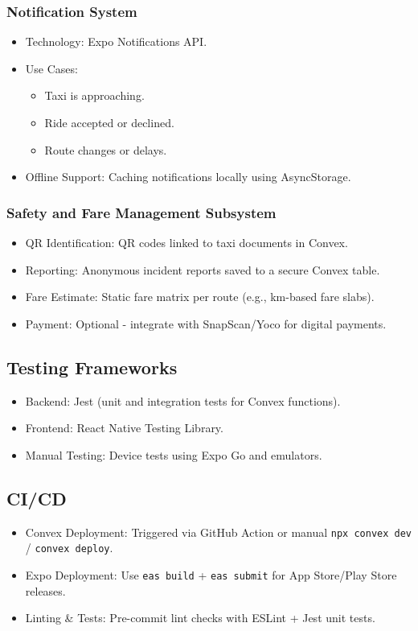 \documentclass[a4paper,12pt]{article}
\begin{document}
\subsubsection*{Notification System}
\begin{itemize}
    \item Technology: Expo Notifications API.
    \item Use Cases:
    \begin{itemize}
        \item Taxi is approaching.
        \item Ride accepted or declined.
        \item Route changes or delays.
    \end{itemize}
    \item Offline Support: Caching notifications locally using AsyncStorage.
\end{itemize}

\subsubsection*{Safety and Fare Management Subsystem}
\begin{itemize}
    \item QR Identification: QR codes linked to taxi documents in Convex.
    \item Reporting: Anonymous incident reports saved to a secure Convex table.
    \item Fare Estimate: Static fare matrix per route (e.g., km-based fare slabs).
    \item Payment: Optional - integrate with SnapScan/Yoco for digital payments.
\end{itemize}

\subsection{Testing Frameworks}
\begin{itemize}
    \item Backend: Jest (unit and integration tests for Convex functions).
    \item Frontend: React Native Testing Library.
    \item Manual Testing: Device tests using Expo Go and emulators.
\end{itemize}

\subsection{CI/CD}
\begin{itemize}
    \item Convex Deployment: Triggered via GitHub Action or manual \texttt{npx convex dev} / \texttt{convex deploy}.
    \item Expo Deployment: Use \texttt{eas build} + \texttt{eas submit} for App Store/Play Store releases.
    \item Linting \& Tests: Pre-commit lint checks with ESLint + Jest unit tests.
\end{itemize}
\end{document}

